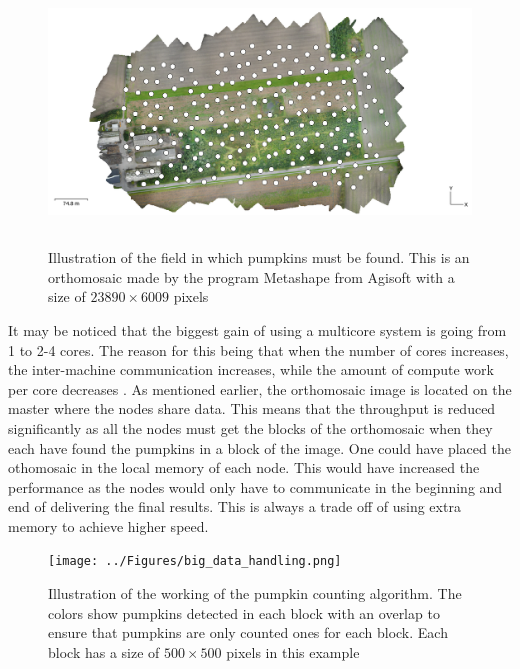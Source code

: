 \documentclass[../Head/Report.tex]{subfiles}
\begin{document}
\begin{figure}[H]
	\centering
	\captionsetup{justification=centering}
	\includegraphics[height=7cm]{../Figures/orthomosaic.png}
    \caption{Illustration of the field in which pumpkins must be found. This is an orthomosaic made by the program Metashape from Agisoft with a size of $23890 \times 6009$ pixels}
    \label{fig:orthomosaic}
\end{figure}

It may be noticed that the biggest gain of using a multicore system is going from 1 to 2-4 cores. The reason for this being that when the number of cores increases, the inter-machine communication increases, while the amount of compute work per core decreases \cite{multicore_system}. As mentioned earlier, the orthomosaic image is located on the master where the nodes share data. This means that the throughput is reduced significantly as all the nodes must get the blocks of the orthomosaic when they each have found the pumpkins in a block of the image. One could have placed the othomosaic in the local memory of each node. This would have increased the performance as the nodes would only have to communicate in the beginning and end of delivering the final results. This is always a trade off of using extra memory to achieve higher speed.          

\begin{figure}[H]
	\centering
	\captionsetup{justification=centering}
	\texttt{[image: ../Figures/big\_data\_handling.png]}
    \caption{Illustration of the working of the pumpkin counting algorithm. The colors show pumpkins detected in each block with an overlap to ensure that pumpkins are only counted ones for each block. Each block has a size of $500 \times 500$ pixels in this example}
    \label{fig:pumkins_color}
\end{figure}
\end{document}
